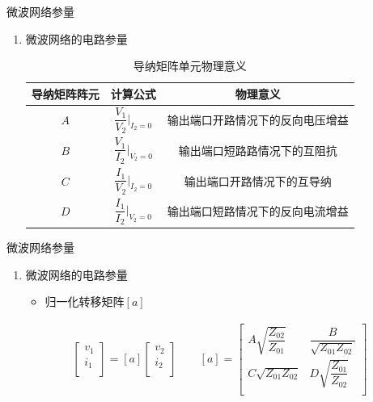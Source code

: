 \begin{frame}{微波网络参量}
    \begin{enumerate}
        \item 微波网络的电路参量
              \begin{table}
                  \caption{导纳矩阵单元物理意义}
                  \footnotesize
                  \begin{tabular}{|c|c|c|}
                      \hline
                      \textbf{导纳矩阵阵元} & \textbf{计算公式}                        & \textbf{物理意义}    \\ \hline
                      $A$             & $\dfrac{V_1}{V_2}\bigg\vert_{I_2=0}$ & 输出端口开路情况下的反向电压增益 \\ \hline
                      $B$             & $\dfrac{V_1}{I_2}\bigg\vert_{V_2=0}$ & 输出端口短路路情况下的互阻抗   \\ \hline
                      $C$             & $\dfrac{I_1}{V_2}\bigg\vert_{I_2=0}$ & 输出端口开路情况下的互导纳    \\ \hline
                      $D$             & $\dfrac{I_1}{I_2}\bigg\vert_{V_2=0}$ & 输出端口短路情况下的反向电流增益 \\ \hline
                  \end{tabular}
              \end{table}
    \end{enumerate}
\end{frame}

\begin{frame}{微波网络参量}
    \begin{enumerate}
        \item 微波网络的电路参量
              \begin{itemize}
                  \item 归一化转移矩阵$[a]$
              \end{itemize}
              \begin{gather*}
                  \begin{bmatrix*}
                      v_1 \\
                      i_1 \\
                  \end{bmatrix*}
                  =[a]
                  \begin{bmatrix*}
                      v_2 \\
                      i_2 \\
                  \end{bmatrix*}
                  \qquad
                  [a]=
                  \begin{bmatrix*}
                      A\sqrt{\dfrac{Z_{02}}{Z_{01}}} & \dfrac{B}{\sqrt{Z_{01}Z_{02}}} \\
                      C\sqrt{Z_{01}Z_{02}} & D\sqrt{\dfrac{Z_{01}}{Z_{02}}} \\
                  \end{bmatrix*}
              \end{gather*}
    \end{enumerate}
\end{frame}

